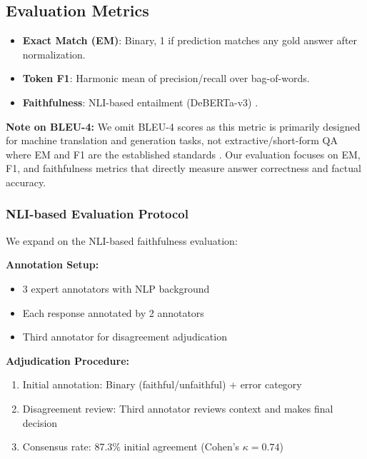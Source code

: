 \documentclass[10pt,twocolumn]{article}
\begin{document}
\subsection{Evaluation Metrics}

\begin{itemize}
    \item \textbf{Exact Match (EM)}: Binary, 1 if prediction matches any gold answer after normalization.
    \item \textbf{Token F1}: Harmonic mean of precision/recall over bag-of-words.
    \item \textbf{Faithfulness}: NLI-based entailment (DeBERTa-v3) \cite{he2021deberta}.
\end{itemize}

\textbf{Note on BLEU-4:} We omit BLEU-4 scores as this metric is primarily designed for machine translation and generation tasks, not extractive/short-form QA where EM and F1 are the established standards \cite{rajpurkar2016squad}. Our evaluation focuses on EM, F1, and faithfulness metrics that directly measure answer correctness and factual accuracy.


\subsubsection{NLI-based Evaluation Protocol}
\label{sec:nli_protocol}

We expand on the NLI-based faithfulness evaluation:

\textbf{Annotation Setup:}
\begin{itemize}
    \item 3 expert annotators with NLP background
    \item Each response annotated by 2 annotators
    \item Third annotator for disagreement adjudication
\end{itemize}

\textbf{Adjudication Procedure:}
\begin{enumerate}
    \item Initial annotation: Binary (faithful/unfaithful) + error category
    \item Disagreement review: Third annotator reviews context and makes final decision
    \item Consensus rate: 87.3\% initial agreement (Cohen's $\kappa = 0.74$)
\end{enumerate}
\end{document}
